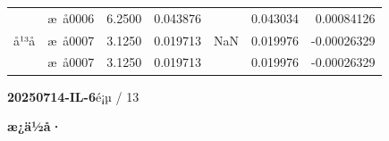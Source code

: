 \documentclass[UTF8,10pt,a4paper,fontset=fandol]{ctexart}
\newcommand{\fieldvalue}[1]{#1}
\begin{document}
\begin{tabularx}{\textwidth}{l l r r r r r}
&
\fieldvalue{æ å0006} &
\fieldvalue{6.2500} &
\fieldvalue{0.043876} & &
\fieldvalue{0.043034} &
\fieldvalue{0.00084126} \\

å¹³å &
\fieldvalue{æ å0007} &
\fieldvalue{3.1250} &
\fieldvalue{0.019713} &
\fieldvalue{NaN} &
\fieldvalue{0.019976} &
\fieldvalue{-0.00026329} \\

&
\fieldvalue{æ å0007} &
\fieldvalue{3.1250} &
\fieldvalue{0.019713} & &
\fieldvalue{0.019976} &
\fieldvalue{-0.00026329}
\end{tabularx}
\normalsize

\newpage

\noindent\textbf{20250714-IL-6}\hfill é¡µ / 13

\medskip
\noindent\textbf{æ¿ä½å·}
\end{document}
